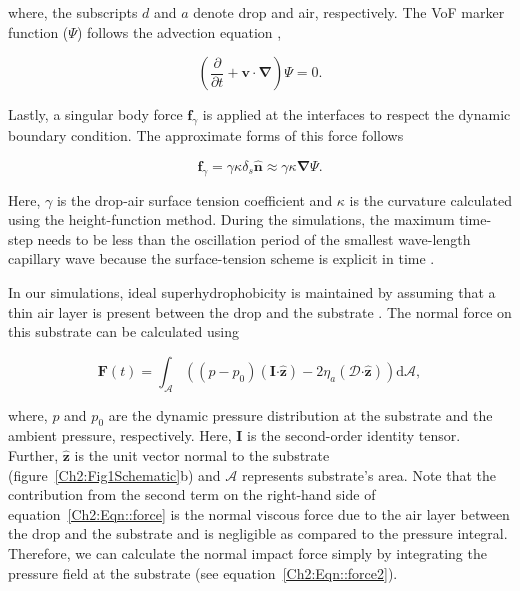 \begin{subappendices}
	\noindent where, the subscripts $d$ and $a$ denote drop and air, respectively. The VoF marker function ($\Psi$) follows the advection equation \cite{prosperetti2009computational, tryggvason2011direct}, 
	
	\begin{equation}
		\label{Ch2::Eqn::Vof2}
		\left(\frac{\partial}{\partial t} + \boldsymbol{v\cdot\nabla}\right)\Psi = 0.
	\end{equation}
	
	Lastly, a singular body force $\boldsymbol{f}_\gamma$ is applied at the interfaces to respect the dynamic boundary condition. The approximate forms of this force follows \cite{brackbill1992continuum}
	
	\begin{equation}\label{Ch2::Eqn::SurfaceTension}
		\boldsymbol{f}_\gamma = \gamma\kappa\delta_{s}\boldsymbol{\hat{n}} \approx \gamma\kappa\boldsymbol{\nabla}\Psi.
	\end{equation}

	\noindent Here, $\gamma$ is the drop-air surface tension coefficient and $\kappa$ is the curvature calculated using the height-function method.  During the simulations, the maximum time-step needs to be less than the oscillation period of the smallest wave-length capillary wave because the surface-tension scheme is explicit in time \citep{popinet2009accurate, basiliskpopinet2}.
	
	In our simulations, ideal superhydrophobicity is maintained by assuming that a thin air layer is present between the drop and the substrate \cite{ramirez2020lifting}. The normal force on this substrate can be calculated using \cite{landau2013course}
	
	\begin{equation}
		\label{Ch2:Eqn::force}
		\boldsymbol{F}(t) = \int_\mathcal{A} \left(\left(p-p_0\right)\left(\boldsymbol{I}\boldsymbol{\cdot}\boldsymbol{\hat{z}}\right) - 2\eta_a\left(\boldsymbol{\mathcal{D}}\boldsymbol{\cdot}\boldsymbol{\hat{z}}\right)\right) \mathrm{d}\mathcal{A},
	\end{equation}

	\noindent where, $p$ and $p_0$ are the dynamic pressure distribution at the substrate and the ambient pressure, respectively. Here, $\boldsymbol{I}$ is the second-order identity tensor. Further, $\boldsymbol{\hat{z}}$ is the unit vector normal to the substrate (figure~\ref{Ch2:Fig1Schematic}b) and $\mathcal{A}$ represents substrate's area. Note that the contribution from the second term on the right-hand side of equation~\eqref{Ch2:Eqn::force} is the normal viscous force due to the air layer between the drop and the substrate and is negligible as compared to the pressure integral. Therefore, we can calculate the normal impact force simply by integrating the pressure field at the substrate (see equation~\eqref{Ch2:Eqn::force2}).
	

\end{subappendices}
